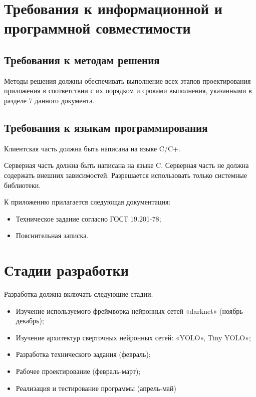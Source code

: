 \documentclass[a4paper,english]{G2-105}
\begin{document}
\section{Требования к информационной и программной совместимости}
\subsection{Требования к методам решения}
\par Методы решения должны обеспечивать выполнение всех этапов проектирования приложения в соответствии с их порядком и сроками выполнения, указанными в разделе 7 данного документа.
\subsection{Требования к языкам программирования}
\par Клиентская часть должна быть написана на языке C/C+.
\par Серверная часть должна быть написана на языке C. Серверная часть не должна содержать внешних зависимостей. Разрешается использовать только системные библиотеки.

\par К приложению прилагается следующая документация:
\begin{itemize}
\item Техническое задание согласно ГОСТ 19.201-78;
\item Пояснительная записка.
\end{itemize}

\section{Стадии разработки}
\par Разработка должна включать следующие стадии:
\begin{itemize}
\item Изучение используемого фреймворка нейронных сетей
«darknet» (ноябрь-декабрь);
\item Изучение архитектур сверточных нейронных сетей: «YOLO»,
Tiny YOLO»;
\item Разработка технического задания (февраль);
\item Рабочее проектирование (февраль-март);
\item Реализация и тестирование программы (апрель-май)
\end{itemize}
\end{document}
